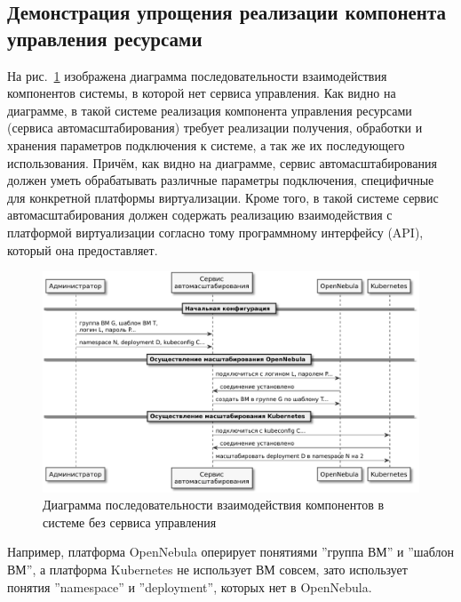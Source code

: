 \subsection[Демонстрация упрощения реализации компонента управления ресурсами]{Демонстрация упрощения реализации компонента \\ управления ресурсами}

На рис.~\ref{result-before} изображена диаграмма последовательности взаимодействия компонентов системы, в которой нет сервиса управления.
Как видно на диаграмме, в такой системе реализация компонента управления ресурсами (сервиса автомасштабирования) требует реализации получения, обработки и хранения параметров подключения к системе, а так же их последующего использования.
Причём, как видно на диаграмме, сервис автомасштабирования должен уметь обрабатывать различные параметры подключения, специфичные для конкретной платформы виртуализации.
Кроме того, в такой системе сервис автомасштабирования должен содержать реализацию взаимодействия с платформой виртуализации согласно тому программному интерфейсу (API), который она предоставляет.

\begin{figure}[H]
    \centering
    \includegraphics[width=\textwidth]{img/result-before.pdf}
    \caption{Диаграмма последовательности взаимодействия компонентов в системе без сервиса управления}
    \label{result-before}
\end{figure}

Например, платформа OpenNebula оперирует понятиями ''группа ВМ'' и ''шаблон ВМ'', а платформа Kubernetes не использует ВМ совсем, зато использует понятия ''namespace'' и ''deployment'', которых нет в OpenNebula.

